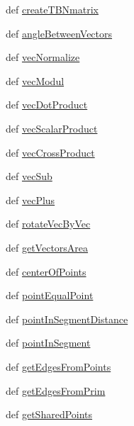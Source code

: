 \begin{DoxyCompactItemize}
\item 
def \hyperlink{namespacelib_1_1_geo_math_a2a5b655c6fbb242b3f85908c25c06774}{create\-T\-B\-Nmatrix}
\item 
def \hyperlink{namespacelib_1_1_geo_math_ac61e7598a137b60e4aaed8f009391b89}{angle\-Between\-Vectors}
\item 
def \hyperlink{namespacelib_1_1_geo_math_a01e8659d3b0d9da4286808ecd1ed4255}{vec\-Normalize}
\item 
def \hyperlink{namespacelib_1_1_geo_math_a41f6a15f166121478e7b2690d5bc2964}{vec\-Modul}
\item 
def \hyperlink{namespacelib_1_1_geo_math_a5c3113c176e2288066a8c98e29167af9}{vec\-Dot\-Product}
\item 
def \hyperlink{namespacelib_1_1_geo_math_a96d31197e467ce44182b9e7353fcb11f}{vec\-Scalar\-Product}
\item 
def \hyperlink{namespacelib_1_1_geo_math_a727154814b69813f4e661109a0b47830}{vec\-Cross\-Product}
\item 
def \hyperlink{namespacelib_1_1_geo_math_a6fb2da0dd5cbd81142bffbf6175d09c5}{vec\-Sub}
\item 
def \hyperlink{namespacelib_1_1_geo_math_a0fc585879fb5c43a5f912f0473ba9021}{vec\-Plus}
\item 
def \hyperlink{namespacelib_1_1_geo_math_a2138d957533ea779dff65b012db29aa9}{rotate\-Vec\-By\-Vec}
\item 
def \hyperlink{namespacelib_1_1_geo_math_a964384b9bea63d4f29c837a8c6db73ac}{get\-Vectors\-Area}
\item 
def \hyperlink{namespacelib_1_1_geo_math_a955139a854ed44cbb923e5bc8ed431ee}{center\-Of\-Points}
\item 
def \hyperlink{namespacelib_1_1_geo_math_adde7db1c07906e315eaf2a84314a8fa9}{point\-Equal\-Point}
\item 
def \hyperlink{namespacelib_1_1_geo_math_ac07ee5d3f8c78769d0e1466bdd935f41}{point\-In\-Segment\-Distance}
\item 
def \hyperlink{namespacelib_1_1_geo_math_a9331622dce988a174ddeebb87f1fe0e9}{point\-In\-Segment}
\item 
def \hyperlink{namespacelib_1_1_geo_math_a5392a5bf2709f4bd49e61e83a2c72ea8}{get\-Edges\-From\-Points}
\item 
def \hyperlink{namespacelib_1_1_geo_math_ac4dd19eb204b9ddd26b178f7fa27b469}{get\-Edges\-From\-Prim}
\item 
def \hyperlink{namespacelib_1_1_geo_math_a736233a8f77a38406508201c8881dcf8}{get\-Shared\-Points}

\end{DoxyCompactItemize}
